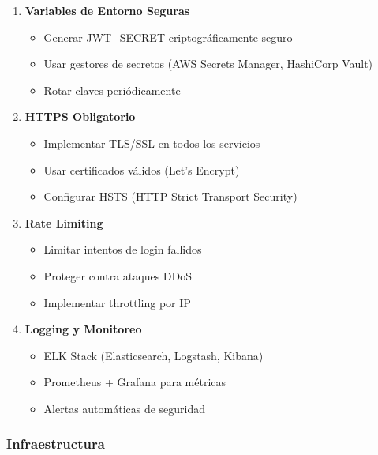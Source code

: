 \documentclass[12pt,a4paper]{article}
\begin{document}
\begin{enumerate}[leftmargin=*]
    \item \textbf{Variables de Entorno Seguras}
    \begin{itemize}
        \item Generar JWT\_SECRET criptográficamente seguro
        \item Usar gestores de secretos (AWS Secrets Manager, HashiCorp Vault)
        \item Rotar claves periódicamente
    \end{itemize}

    \item \textbf{HTTPS Obligatorio}
    \begin{itemize}
        \item Implementar TLS/SSL en todos los servicios
        \item Usar certificados válidos (Let's Encrypt)
        \item Configurar HSTS (HTTP Strict Transport Security)
    \end{itemize}

    \item \textbf{Rate Limiting}
    \begin{itemize}
        \item Limitar intentos de login fallidos
        \item Proteger contra ataques DDoS
        \item Implementar throttling por IP
    \end{itemize}

    \item \textbf{Logging y Monitoreo}
    \begin{itemize}
        \item ELK Stack (Elasticsearch, Logstash, Kibana)
        \item Prometheus + Grafana para métricas
        \item Alertas automáticas de seguridad
    \end{itemize}
\end{enumerate}

\subsubsection{Infraestructura}
\end{document}
